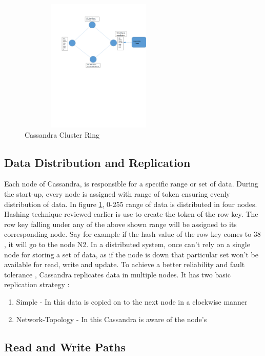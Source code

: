 \documentclass[9pt,twocolumn,twoside]{../../styles/osajnl}
\begin{document}
\begin{figure}[h]
\begin{center}
\includegraphics[width =3in,height=2.5in]{images/Cassandra_Ring_figure1}
\caption{Cassandra Cluster Ring}
\label{fig:figure1}
\end{center}
\end{figure}

\subsection{Data Distribution and Replication}

Each node of Cassandra, is responsible for a specific range or set of data. During the start-up, every node is assigned with range of token ensuring evenly distribution of data. In figure \ref{fig:figure1}, 0-255 range of data is distributed in four nodes. Hashing technique reviewed earlier is use to create the token of the row key. The row key falling under any of the above shown range will be assigned to its corresponding node. Say for example if the hash value of the row key comes to 38 , it will go to the node N2. 
In a distributed system, once can't rely on a single node for storing a set of data, as if the node is down that particular set won't be available for read, write and update. To achieve a better reliability and fault tolerance , Cassandra replicates data in multiple nodes. It has two basic replication strategy : 
\begin{enumerate}
     \item Simple - In this data is copied on to the next node in a clockwise manner
     \item Network-Topology - In this Cassandra is aware of the node's     
\end{enumerate}

\subsection{Read and Write Paths}
\end{document}
